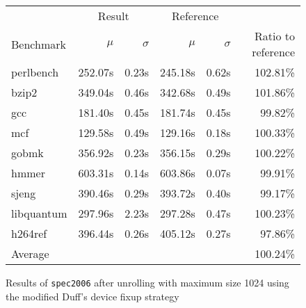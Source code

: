 \begin{figure}[th]
    \begin{center}
        \begin{tabular}{lrrrrr}
            \toprule
            & \multicolumn{2}{c}{Result} & \multicolumn{2}{c}{Reference}\\
            Benchmark & $\mu$ & $\sigma$ & $\mu$ & $\sigma$ & Ratio to reference\\
            \midrule
            perlbench & 252.07s & 0.23s & 245.18s & 0.62s & 102.81\%\\
            bzip2 & 349.04s & 0.46s & 342.68s & 0.49s & 101.86\%\\
            gcc & 181.40s & 0.45s & 181.74s & 0.45s & 99.82\%\\
            mcf & 129.58s & 0.49s & 129.16s & 0.18s & 100.33\%\\
            gobmk & 356.92s & 0.23s & 356.15s & 0.29s & 100.22\%\\
            hmmer & 603.31s & 0.14s & 603.86s & 0.07s & 99.91\%\\
            sjeng & 390.46s & 0.29s & 393.72s & 0.40s & 99.17\%\\
            libquantum & 297.96s & 2.23s & 297.28s & 0.47s & 100.23\%\\
            h264ref & 396.44s & 0.26s & 405.12s & 0.27s & 97.86\%\\
            \midrule
            Average & & & & & 100.24\%\\
            \bottomrule
        \end{tabular}
    \end{center}
    \caption{Results of \texttt{spec2006} after unrolling with maximum size 1024 using the modified Duff's device fixup strategy}
    \label{fig:eval:perf:duff:1024}
\end{figure}